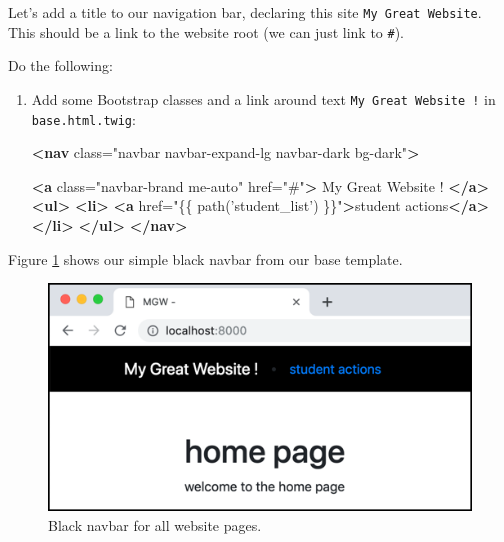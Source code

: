 \documentclass[a4paperpaper,openright]{book}
\newenvironment{Shaded}{}{}
\newcommand{\KeywordTok}[1]{\textcolor[rgb]{0.00,0.44,0.13}{\textbf{#1}}}
\newcommand{\NormalTok}[1]{#1}
\newcommand{\OtherTok}[1]{\textcolor[rgb]{0.00,0.44,0.13}{#1}}
\newcommand{\StringTok}[1]{\textcolor[rgb]{0.25,0.44,0.63}{#1}}
\begin{document}
Let's add a title to our navigation bar, declaring this site
\texttt{My\ Great\ Website}. This should be a link to the website root
(we can just link to \texttt{\#}).

Do the following:

\begin{enumerate}
\def\labelenumi{\arabic{enumi}.}
\item
  Add some Bootstrap classes and a link around text
  \texttt{My\ Great\ Website\ !} in \texttt{base.html.twig}:

\begin{Shaded}
\begin{Highlighting}[]
       \KeywordTok{<nav}\OtherTok{ class=}\StringTok{"navbar navbar-expand-lg navbar-dark bg-dark"}\KeywordTok{>}

           \KeywordTok{<a}\OtherTok{ class=}\StringTok{"navbar-brand me-auto"}\OtherTok{ href=}\StringTok{"#"}\KeywordTok{>}
\NormalTok{            My Great Website !}
            \KeywordTok{</a>}
           \KeywordTok{<ul>}
               \KeywordTok{<li>}
                   \KeywordTok{<a}\OtherTok{ href=}\StringTok{"\{\{ path('student_list') \}\}"}\KeywordTok{>}\NormalTok{student actions}\KeywordTok{</a>}
               \KeywordTok{</li>}
           \KeywordTok{</ul>}
       \KeywordTok{</nav>}
\end{Highlighting}
\end{Shaded}
\end{enumerate}

Figure \ref{black_nav} shows our simple black navbar from our base
template.

\begin{figure}
\centering
\includegraphics{./tex2pdf.-51e064f4751cea0e/d0d0a0c5c02cdeae130278796b262303df02b576.png}
\caption{Black navbar for all website pages. \label{black_nav}}
\end{figure}
\end{document}
